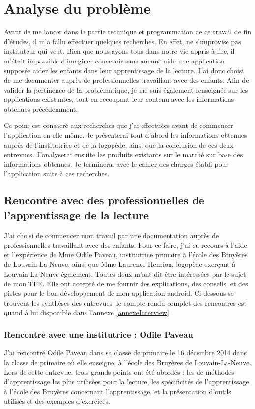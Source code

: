 \section{Analyse du problème}
Avant de me lancer dans la partie technique et programmation de ce travail de fin d'études, il m'a fallu effectuer quelques recherches. En effet, ne s'improvise pas instituteur qui veut. Bien que nous ayons tous dans notre vie appris à lire, il m'était impossible d'imaginer concevoir sans aucune aide une application supposée aider les enfants dans leur apprentissage de la lecture. J'ai donc choisi de me documenter auprès de professionnelles travaillant avec des enfants. Afin de valider la pertinence de la problématique, je me suis également renseignée sur les applications existantes, tout en recoupant leur contenu avec les informations obtenues précédemment.

Ce point est consacré aux recherches que j'ai effectuées avant de commencer l'application en elle-même. Je présenterai tout d'abord les informations obtenues auprès de l'institutrice et de la logopède, ainsi que la conclusion de ces deux entrevues. J'analyserai ensuite les produits existants sur le marché sur base des informations obtenues. Je terminerai avec le cahier des charges établi pour l'application suite à ces recherches.

\subsection{Rencontre avec des professionnelles de l'apprentissage de la lecture}
J'ai choisi de commencer mon travail par une documentation auprès de professionnelles travaillant avec des enfants. Pour ce faire, j'ai eu recours à l'aide et l'expérience de Mme Odile Paveau, institutrice primaire à l'école des Bruyères de Louvain-La-Neuve, ainsi que Mme Laurence Henrion, logopède exerçant à Louvain-La-Neuve également. Toutes deux m'ont dit être intéressées par le sujet de mon TFE. Elle ont accepté de me fournir des explications, des conseils, et des pistes pour le bon développement de mon application android. Ci-dessous se trouvent les synthèses des entrevues, le compte-rendu complet des rencontres est quand à lui disponible dans l'annexe \ref{annexeInterview}.

\subsubsection{Rencontre avec une institutrice : Odile Paveau\label{Freinet}}
J'ai rencontré Odile Paveau dans sa classe de primaire le 16 décembre 2014 dans la classe de primaire où elle enseigne, à l'école des Bruyères de Louvain-La-Neuve. Lors de cette entrevue, trois grands points ont été abordés : les de méthodes d'apprentissage les plus utilisées pour la lecture, les spécificités de l'apprentissage à l'école des Bruyères concernant l'apprentissage, et la présentation d'outils utilisés et des exemples d'exercices.\\

